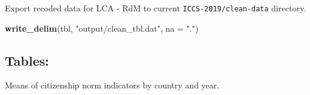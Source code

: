 \documentclass[]{article}
\newenvironment{Shaded}{\begin{snugshade}}{\end{snugshade}}
\newcommand{\CommentTok}[1]{\textcolor[rgb]{0.56,0.35,0.01}{\textit{#1}}}
\newcommand{\DataTypeTok}[1]{\textcolor[rgb]{0.13,0.29,0.53}{#1}}
\newcommand{\KeywordTok}[1]{\textcolor[rgb]{0.13,0.29,0.53}{\textbf{#1}}}
\newcommand{\NormalTok}[1]{#1}
\newcommand{\OperatorTok}[1]{\textcolor[rgb]{0.81,0.36,0.00}{\textbf{#1}}}
\newcommand{\OtherTok}[1]{\textcolor[rgb]{0.56,0.35,0.01}{#1}}
\newcommand{\StringTok}[1]{\textcolor[rgb]{0.31,0.60,0.02}{#1}}
\begin{document}
Export recoded data for LCA - RdM to current
\texttt{ICCS-2019/clean-data} directory.

\begin{Shaded}
\begin{Highlighting}[]
\KeywordTok{write_delim}\NormalTok{(tbl, }\StringTok{"output/clean_tbl.dat"}\NormalTok{, }\DataTypeTok{na =} \StringTok{"."}\NormalTok{)}
\end{Highlighting}
\end{Shaded}

\hypertarget{tables}{%
\subsection{Tables:}\label{tables}}

Means of citizenship norm indicators by country and year.

\begin{Shaded}
\end{Shaded}
\end{document}
